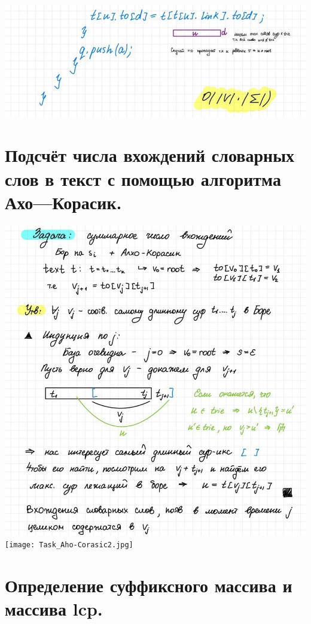 \newline \includegraphics[width=1\linewidth]{images/Building_Aho-Corasic3.jpg}

\section{Подсчёт числа вхождений словарных слов в текст с помощью алгоритма Ахо—Корасик.}
\includegraphics[width=1\linewidth]{images/Task_Aho-Corasic1.jpg}
\newline \texttt{[image: Task\_Aho-Corasic2.jpg]}

\section{Определение суффиксного массива и массива lcp.}

